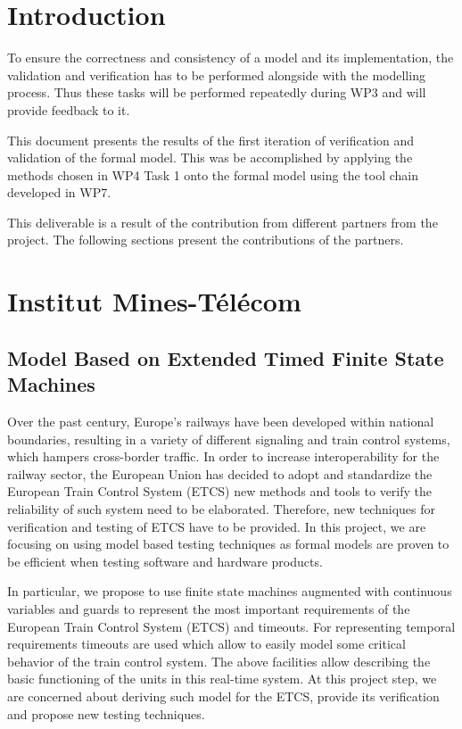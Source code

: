 \documentclass{template/openetcs_article}
\begin{document}

\section*{Introduction}

To ensure the correctness and consistency of a model and its implementation, the validation
and verification has to be performed alongside with the modelling process. Thus these tasks will
be performed repeatedly during WP3 and will provide feedback to it.

This document presents the results of the first iteration of verification and validation of the formal model. This was be accomplished
by applying the methods chosen in WP4 Task 1 onto the formal model using the tool
chain developed in WP7. 

This deliverable is a result of the contribution from different partners from the project. The following sections present the contributions of the partners.

\section{Institut Mines-Télécom}

\subsection{Model Based on Extended Timed Finite State Machines}

Over the past century, Europe's railways have been developed within national boundaries, resulting in a variety of different signaling and train control systems, which hampers cross-border traffic. In order to increase interoperability for the railway sector, the European Union has decided to adopt and standardize the European Train Control System (ETCS) new methods and tools to verify the reliability of such system need to be elaborated. Therefore, new techniques for verification and testing of ETCS have to be provided. In this project, we are focusing on using model based testing techniques as formal models are proven to be efficient when testing software and hardware products.
  
In particular, we propose to use finite state machines augmented with continuous variables and guards to represent the most important requirements of the European Train Control System (ETCS) and timeouts. For representing temporal requirements timeouts are used which allow to easily model some critical behavior of the train control system. The above facilities allow describing the basic functioning of the units in this real-time system. At this project step, we are concerned about deriving such model for the ETCS, provide its verification and propose new testing techniques.
\end{document}
